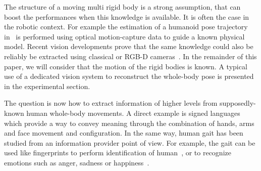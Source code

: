 \documentclass[journal]{IEEEtran}
\begin{document}
The structure of a moving multi rigid body is a strong assumption, that
can boost the performances when this knowledge is available. It is often the case in the robotic context. For example the
estimation of a humanoid pose trajectory in~\cite{zordan03} is performed
using optical motion-capture data to guide a known physical
model. Recent vision developments prove that the same knowledge could also be reliably be extracted using classical or RGB-D cameras~\cite{oikonomidis11}.
In the remainder of this paper, we will consider that
the motion of the rigid bodies is known. A typical use of a dedicated vision system to reconstruct the whole-body pose is presented in the experimental section.

The question is now how to extract information of higher levels from supposedly-known human
whole-body movements. A direct example is signed languages which
provide a way to convey meaning through the combination
of hands, arms and face movement and configuration. In the
same way, human gait has been studied from an information
provider point of view. For example, the gait can be used like
fingerprints to perform identification of human~\cite{cutting77, kale04}, or to
recognize emotions such as anger, sadness or happiness~\cite{karg10}.
\end{document}
